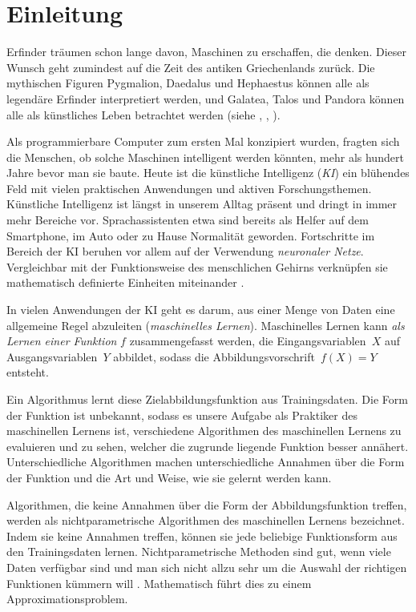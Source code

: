 \chapter*{Einleitung}

Erfinder träumen schon lange davon, Maschinen zu erschaffen, die denken. Dieser Wunsch geht zumindest auf die Zeit des antiken Griechenlands zurück. Die mythischen Figuren Pygmalion, Daedalus und Hephaestus können alle als legendäre Erfinder interpretiert werden, und Galatea, Talos und Pandora können alle als künstliches Leben betrachtet werden (siehe \cite{2005metamorphoses}, \cite{sparkes1996red}, \cite{hesiod1996works}).

Als programmierbare Computer zum ersten Mal konzipiert wurden, fragten sich die Menschen, ob solche Maschinen intelligent werden könnten, mehr als hundert Jahre bevor man sie baute. Heute ist die künstliche Intelligenz (\emph{KI}) ein blühendes Feld mit vielen praktischen Anwendungen und aktiven Forschungsthemen. 
Künstliche Intelligenz ist längst in unserem Alltag präsent und dringt in immer mehr Bereiche vor. Sprachassistenten etwa sind bereits als Helfer auf dem Smartphone, im Auto oder zu Hause Normalität geworden. Fortschritte im Bereich der KI beruhen vor allem auf der Verwendung \emph{neuronaler Netze}. Vergleichbar mit der Funktionsweise des menschlichen Gehirns verknüpfen sie mathematisch definierte Einheiten miteinander \cite{goodfellow2016deep}.

In vielen Anwendungen der KI geht es darum, aus einer Menge von Daten eine allgemeine Regel abzuleiten (\emph{maschinelles Lernen}). Maschinelles Lernen kann \emph{als Lernen einer Funktion} $f$ zusammengefasst werden, die Eingangsvariablen~$X$ auf Ausgangsvariablen~$Y$ abbildet, sodass die Abbildungsvorschrift~$f(X) = Y$ entsteht.

Ein Algorithmus lernt diese Zielabbildungsfunktion aus Trainingsdaten.
Die Form der Funktion ist unbekannt, sodass es unsere Aufgabe als Praktiker des maschinellen Lernens ist, verschiedene Algorithmen des maschinellen Lernens zu evaluieren und zu sehen, welcher die zugrunde liegende Funktion besser annähert.
Unterschiedliche Algorithmen machen unterschiedliche Annahmen über die Form der Funktion und die Art und Weise, wie sie gelernt werden kann.

Algorithmen, die keine Annahmen über die Form der Abbildungsfunktion treffen, werden als nichtparametrische Algorithmen des maschinellen Lernens bezeichnet. Indem sie keine Annahmen treffen, können sie jede beliebige Funktionsform aus den Trainingsdaten lernen.
Nichtparametrische Methoden sind gut, wenn viele Daten verfügbar sind und man sich nicht allzu sehr um die Auswahl der richtigen Funktionen kümmern will \cite[Seite~757]{AI}. Mathematisch führt dies zu einem Approximationsproblem. 

